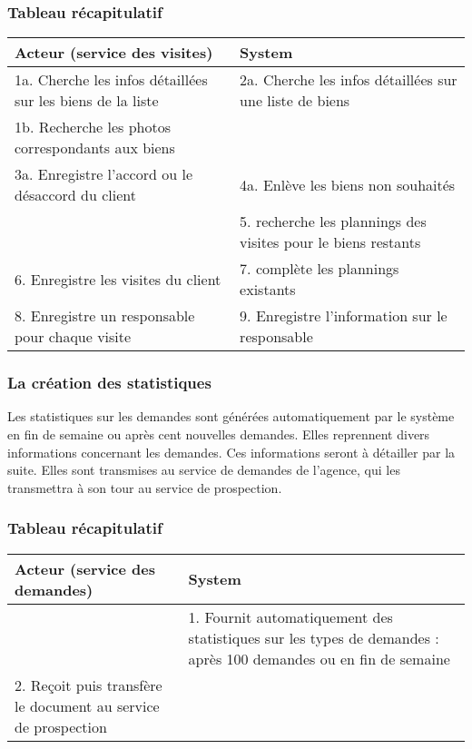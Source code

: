 \subsubsection*{Tableau récapitulatif}
\begin{longtable}{|p{7.5cm}|p{7.5cm}|}
\hline
Acteur (service des visites)& System\\
\hline
1a. Cherche les infos détaillées sur les biens de la liste & 2a. Cherche les infos détaillées sur une liste de biens\\
1b. Recherche les photos correspondants aux biens & \\
3a. Enregistre l'accord ou le désaccord du client & 4a. Enlève les biens non souhaités\\
& 5. recherche les plannings des visites pour le biens restants\\
6. Enregistre les visites du client & 7. complète les plannings existants\\
8. Enregistre un responsable pour chaque visite & 9. Enregistre l'information sur le responsable\\
\hline
\end{longtable}
\subsubsection{La création des statistiques}
Les statistiques sur les demandes sont générées automatiquement par le système en fin de semaine ou après cent nouvelles demandes.
Elles reprennent divers informations concernant les demandes. Ces informations seront à détailler par la suite.
Elles sont transmises au service de demandes de l'agence, qui les transmettra à son tour au service de prospection.

\subsubsection*{Tableau récapitulatif}
\begin{longtable}{|p{7.5cm}|p{7.5cm}|}
\hline
Acteur (service des demandes)& System\\
\hline
& 1. Fournit automatiquement des statistiques sur les types de demandes : après 100 demandes ou en fin de semaine\\
2. Reçoit puis transfère le document au service de prospection & \\
\hline
\end{longtable}
